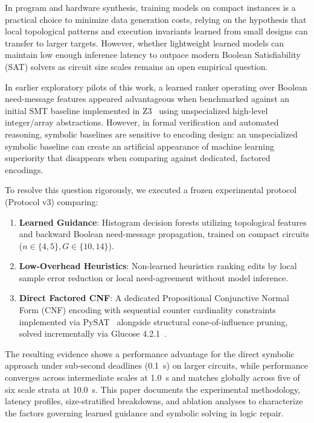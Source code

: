 \documentclass[11pt,a4paper]{article}
\begin{document}
In program and hardware synthesis, training models on compact instances is a practical choice to minimize data generation costs, relying on the hypothesis that local topological patterns and execution invariants learned from small designs can transfer to larger targets. However, whether lightweight learned models can maintain low enough inference latency to outpace modern Boolean Satisfiability (SAT) solvers as circuit size scales remains an open empirical question.

In earlier exploratory pilots of this work, a learned ranker operating over Boolean need-message features appeared advantageous when benchmarked against an initial SMT baseline implemented in Z3~\citep{demoura2008z3} using unspecialized high-level integer/array abstractions. However, in formal verification and automated reasoning, symbolic baselines are sensitive to encoding design: an unspecialized symbolic baseline can create an artificial appearance of machine learning superiority that disappears when comparing against dedicated, factored encodings.

To resolve this question rigorously, we executed a frozen experimental protocol (Protocol v3) comparing:
\begin{enumerate}
    \item \textbf{Learned Guidance}: Histogram decision forests utilizing topological features and backward Boolean need-message propagation, trained on compact circuits ($n \in \{4, 5\}, G \in \{10, 14\}$).
    \item \textbf{Low-Overhead Heuristics}: Non-learned heuristics ranking edits by local sample error reduction or local need-agreement without model inference.
    \item \textbf{Direct Factored CNF}: A dedicated Propositional Conjunctive Normal Form (CNF) encoding with sequential counter cardinality constraints implemented via PySAT~\citep{ignatiev2018pysat} alongside structural cone-of-influence pruning, solved incrementally via Glucose 4.2.1~\citep{audemard2018glucose}.
\end{enumerate}

The resulting evidence shows a performance advantage for the direct symbolic approach under sub-second deadlines (0.1~s) on larger circuits, while performance converges across intermediate scales at 1.0~s and matches globally across five of six scale strata at 10.0~s. This paper documents the experimental methodology, latency profiles, size-stratified breakdowns, and ablation analyses to characterize the factors governing learned guidance and symbolic solving in logic repair.
\end{document}
